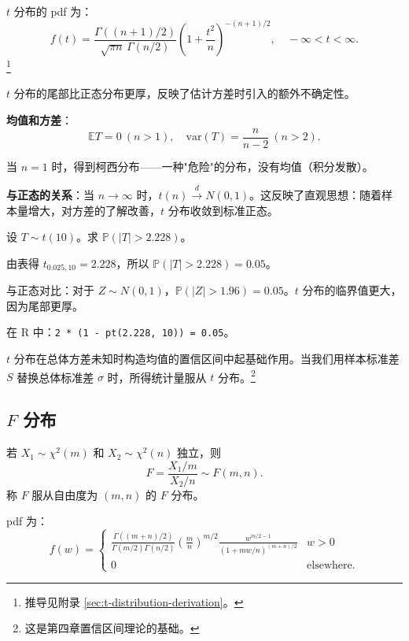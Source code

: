 $t$ 分布的 pdf 为：
\[
f(t) = \frac{\Gamma((n+1)/2)}{\sqrt{\pi n}\,\Gamma(n/2)} \left(1 + \frac{t^{2}}{n}\right)^{-(n+1)/2}, \quad -\infty < t < \infty.
\label{eq:t-pdf-ch3}
\]\footnote{推导见附录 \cref{sec:t-distribution-derivation}。}

$t$ 分布的尾部比正态分布更厚，反映了估计方差时引入的额外不确定性。

\textbf{均值和方差}：
\[
\mathbb{E}T = 0 \ (n>1), \quad \text{var}(T) = \frac{n}{n-2} \ (n>2).
\label{eq:t-moments-ch3}
\]

当 $n=1$ 时，得到柯西分布——一种"危险"的分布，没有均值（积分发散）。

\textbf{与正态的关系}：当 $n \to \infty$ 时，$t(n) \xrightarrow{d} N(0,1)$。这反映了直观思想：随着样本量增大，对方差的了解改善，$t$ 分布收敛到标准正态。

\begin{example}[$t$ 分布应用]\label{ex:t-distribution-ch3}
设 $T \sim t(10)$。求 $\mathbb{P}(|T| > 2.228)$。

由表得 $t_{0.025, 10} = 2.228$，所以 $\mathbb{P}(|T| > 2.228) = 0.05$。

与正态对比：对于 $Z \sim N(0,1)$，$\mathbb{P}(|Z| > 1.96) = 0.05$。$t$ 分布的临界值更大，因为尾部更厚。

在 R 中：\texttt{2 * (1 - pt(2.228, 10)) = 0.05}。
\end{example}

$t$ 分布在总体方差未知时构造均值的置信区间中起基础作用。当我们用样本标准差 $S$ 替换总体标准差 $\sigma$ 时，所得统计量服从 $t$ 分布。\footnote{这是第四章置信区间理论的基础。}

\subsection{$F$ 分布}\label{sub:f-distribution-ch3}

\begin{definition}[$F$ 分布]\label{def:f-distribution-ch3}
若 $X_1 \sim \chi^{2}(m)$ 和 $X_2 \sim \chi^{2}(n)$ 独立，则
\[
F = \frac{X_1/m}{X_2/n} \sim F(m, n).
\label{eq:f-distribution-ch3}
\]
称 $F$ 服从自由度为 $(m, n)$ 的 $F$ 分布。
\end{definition}

pdf 为：
\[
f(w) = \begin{cases}
\frac{\Gamma((m+n)/2)}{\Gamma(m/2)\Gamma(n/2)} \left(\frac{m}{n}\right)^{m/2} \frac{w^{m/2-1}}{(1 + mw/n)^{(m+n)/2}} & w > 0 \\[4pt]
0 & \text{elsewhere}.
\end{cases}
\label{eq:f-pdf-ch3}
\]

